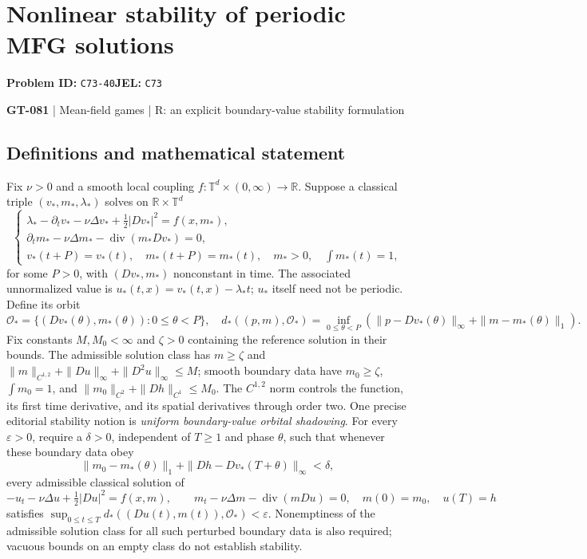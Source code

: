 \documentclass[11pt,a4paper]{article}
\begin{document}
\section*{Nonlinear stability of periodic MFG solutions}
\textbf{Problem ID:} \texttt{C73-40}\quad \textbf{JEL:} \texttt{C73}\par
\label{problem:OP-0211}
\label{game:GT-081}
{\sffamily\small\color{muted}
{\small\textbf{GT-081} | Mean-field games | R: an explicit boundary-value stability formulation\par}
\par}
\subsection*{Definitions and mathematical statement}
Fix $\nu>0$ and a smooth local coupling $f:\mathbb T^d\times(0,\infty)\to\mathbb R$. Suppose a classical triple $(v_*,m_*,\lambda_*)$ solves on $\mathbb R\times\mathbb T^d$
\[
 \begin{cases}
 \lambda_*-\partial_t v_*-\nu\Delta v_*+\tfrac12|Dv_*|^2=f(x,m_*),\\
 \partial_t m_*-\nu\Delta m_*-\operatorname{div}(m_*Dv_*)=0,\\
 v_*(t+P)=v_*(t),\quad m_*(t+P)=m_*(t),\quad
 m_*>0,\quad\int m_*(t)=1,
 \end{cases}
\]
for some $P>0$, with $(Dv_*,m_*)$ nonconstant in time. The associated unnormalized value is $u_*(t,x)=v_*(t,x)-\lambda_*t$; $u_*$ itself need not be periodic. Define its orbit
\[
 \mathcal O_* =\{(Dv_*(\theta),m_*(\theta)):0\leq\theta<P\},
 \quad
 d_*((p,m),\mathcal O_*)=
 \inf_{0\leq\theta<P}(\|p-Dv_*(\theta)\|_\infty+\|m-m_*(\theta)\|_1).
\]
Fix constants $M,M_0<\infty$ and $\zeta>0$ containing the reference solution in their bounds. The admissible solution class has $m\geq\zeta$ and $\|m\|_{C^{1,2}}+\|Du\|_\infty+\|D^2u\|_\infty\leq M$; smooth boundary data have $m_0\geq\zeta$, $\int m_0=1$, and $\|m_0\|_{C^2}+\|Dh\|_{C^1}\leq M_0$. The $C^{1,2}$ norm controls the function, its first time derivative, and its spatial derivatives through order two. One precise editorial stability notion is \emph{uniform boundary-value orbital shadowing}. For every $\varepsilon>0$, require a $\delta>0$, independent of $T\geq1$ and phase $\theta$, such that whenever these boundary data obey
\[
 \|m_0-m_*(\theta)\|_1+\|Dh-Dv_*(T+\theta)\|_\infty<\delta,
\]
every admissible classical solution of
\[
 -u_t-\nu\Delta u+\tfrac12|Du|^2=f(x,m),\qquad
 m_t-\nu\Delta m-\operatorname{div}(mDu)=0,
 \quad m(0)=m_0,\quad u(T)=h
\]
satisfies $\sup_{0\leq t\leq T}d_*((Du(t),m(t)),\mathcal O_*)<\varepsilon$. Nonemptiness of the admissible solution class for all such perturbed boundary data is also required; vacuous bounds on an empty class do not establish stability.
\end{document}
